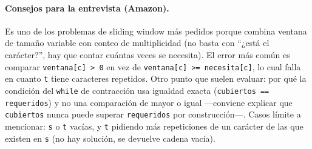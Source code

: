 \paragraph{Consejos para la entrevista (Amazon).} Es uno de los problemas de
sliding window más pedidos porque combina ventana de tamaño variable con
conteo de multiplicidad (no basta con ``¿está el carácter?'', hay que
contar cuántas veces se necesita). El error más común es comparar
\texttt{ventana[c] > 0} en vez de \texttt{ventana[c] >= necesita[c]}, lo
cual falla en cuanto \texttt{t} tiene caracteres repetidos. Otro punto que
suelen evaluar: por qué la condición del \texttt{while} de contracción usa
igualdad exacta (\texttt{cubiertos == requeridos}) y no una comparación de
mayor o igual —conviene explicar que \texttt{cubiertos} nunca puede superar
\texttt{requeridos} por construcción—. Casos límite a mencionar: \texttt{s}
o \texttt{t} vacías, y \texttt{t} pidiendo más repeticiones de un carácter
de las que existen en \texttt{s} (no hay solución, se devuelve cadena
vacía).
